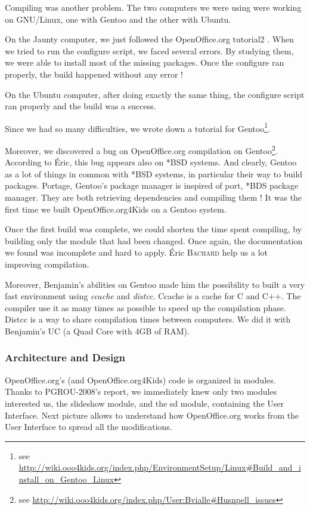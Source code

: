 \documentclass[a4paper,11pt]{article}
\begin{document}
Compiling was another problem. The two computers we were using were working on
GNU/Linux, one with Gentoo and the other with Ubuntu.

On the Jaunty computer, we just followed the OpenOffice.org tutorial2 . When
we tried to run the configure script, we faced several errors. By studying
them, we were able to install most of the missing packages. Once the configure
ran properly, the build happened without any error !

On the Ubuntu computer, after doing exactly the same thing, the configure
script ran properly and the build was a success.

Since we had so many difficulties, we wrote down a tutorial for
Gentoo\footnote{see
\url{http://wiki.ooo4kids.org/index.php/EnvironmentSetup/Linux\#Build\_and\_install\_on\_Gentoo\_Linux}}.

Moreover, we discovered a bug on OpenOffice.org compilation on Gentoo\footnote{see
\url{http://wiki.ooo4kids.org/index.php/User:Bvialle\#Husnpell\_issues}}.
According to Éric, this bug appears also on *BSD systems. And clearly, Gentoo
as a lot of things in common with *BSD systems, in particular their way to
build packages. Portage, Gentoo's package manager is inspired of port, *BDS
package manager. They are both retrieving dependencies and compiling them ! It
was the first time we built OpenOffice.org4Kids on a Gentoo system.

Once the first build was complete, we could shorten the time spent compiling,
by building only the module that had been changed. Once again, the
documentation we found was incomplete and hard to apply. Éric \textsc{Bachard}
help us a lot improving compilation.

Moreover, Benjamin's abilities on Gentoo made him the possibility to built a
very fast environment using \emph{ccache} and \emph{distcc}. Ccache is a cache
for C and C++. The compiler use it as many times as possible to speed up the
compilation phase. Distcc is a way to share compilation times between
computers. We did it with Benjamin's UC (a Quad Core with 4GB of RAM).


\subsubsection*{Architecture and Design}

OpenOffice.org’s (and OpenOffice.org4Kids) code is organized in modules. Thanks to
PGROU-2008’s report, we immediately knew only two modules interested us, the
slideshow module, and the sd module, containing the User Interface. Next
picture allows to understand how OpenOffice.org works from the User Interface to
spread all the modifications.
\end{document}
